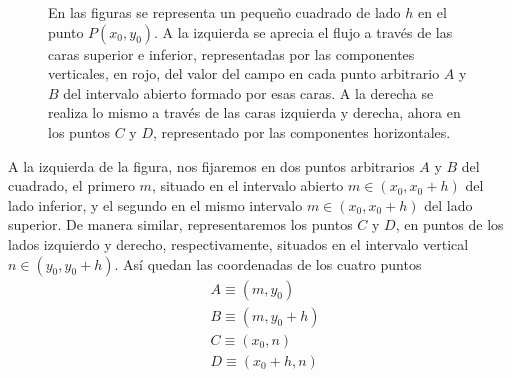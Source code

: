 \begin{figure}[ht]
  \caption{En las figuras se representa un pequeño cuadrado de lado $h$ en el punto
    $P(x_0,y_0)$.
    A la izquierda se aprecia el flujo a través de las caras superior e inferior,
    representadas por las componentes verticales, en rojo, del valor del campo en cada
    punto arbitrario $A$ y $B$ del intervalo abierto formado por esas caras.
    A la derecha se realiza lo mismo a través de las caras izquierda y derecha, ahora en
    los puntos $C$ y $D$, representado por las componentes horizontales.}
  \label{fig:R2-rect-divergencia}
\end{figure}

A la izquierda de la figura, nos fijaremos en dos puntos arbitrarios $A$ y $B$ del
cuadrado, el primero $m$, situado en el intervalo abierto $m\in (x_0, x_0+h)$ del lado
inferior, y el segundo en el mismo intervalo $m\in(x_0, x_0+h)$ del lado superior.
De manera similar, representaremos los puntos $C$ y $D$, en puntos de los lados
izquierdo y derecho, respectivamente, situados en el intervalo vertical
$n\in(y_0, y_0+h)$.
Así quedan las coordenadas de los cuatro puntos
\begin{align*}
  &A\equiv(m, y_0)\\
  &B\equiv(m, y_0+h)\\
  &C\equiv(x_0,n)\\
  &D\equiv(x_0+h,n)
\end{align*}

